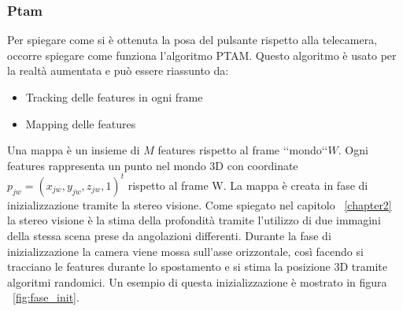 \subsubsection{Ptam}
Per spiegare come si è ottenuta la posa del pulsante rispetto alla telecamera, occorre spiegare come funziona l'algoritmo PTAM. Questo algoritmo è usato per la realtà aumentata e può essere riassunto da:
\begin{itemize}
\item Tracking delle features in ogni frame
\item Mapping delle features
\end{itemize}
Una mappa è un insieme di $M$ features rispetto al frame \lq \lq mondo\lq\lq $W$. Ogni features rappresenta un punto nel mondo 3D con coordinate $p_{jw} = (x_{jw} , y_{jw} , z_{jw}, 1)^t$ rispetto al frame W. La mappa è creata in fase di inizializzazione tramite la stereo visione. Come spiegato nel capitolo ~\ref{chapter2} la stereo visione è la stima della profondità tramite l'utilizzo di due immagini della stessa scena prese da angolazioni differenti. Durante la fase di inizializzazione la camera viene mossa sull'asse orizzontale, così facendo si tracciano le features durante lo spostamento e si stima la posizione 3D tramite algoritmi randomici. Un esempio di questa inizializzazione è mostrato in figura ~\ref{fig:fase_init}.

